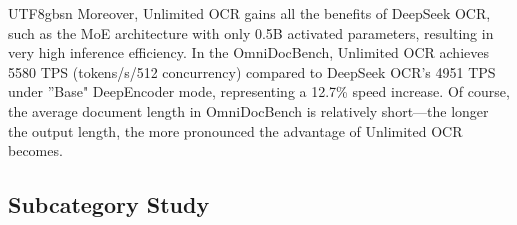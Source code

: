 \documentclass[11pt, a4paper, logo, copyright, nonumbering]{deepseek}
\begin{document}
\begin{CJK*}{UTF8}{gbsn}
Moreover, Unlimited OCR gains all the benefits of DeepSeek OCR, such as the MoE architecture with only 0.5B activated parameters, resulting in very high inference efficiency. In the OmniDocBench, Unlimited OCR achieves 5580 TPS (tokens/s/512 concurrency) compared to DeepSeek OCR’s 4951 TPS under ''Base" DeepEncoder mode, representing a 12.7\% speed increase. Of course, the average document length in OmniDocBench is relatively short—the longer the output length, the more pronounced the advantage of Unlimited OCR becomes.



        
		





\subsection{Subcategory Study}


\end{CJK*}
\end{document}
